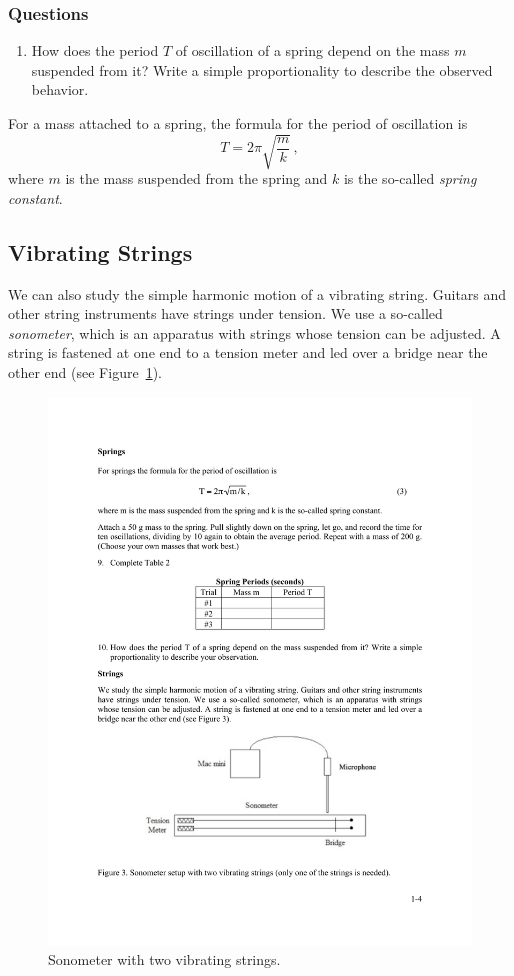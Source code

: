 \documentclass[11pt]{NSF}
\def\be{\begin{equation}}
\def\ee{\end{equation}}
\def\ben{\begin{enumerate}}
\def\een{\end{enumerate}}
\begin{document}
\subsubsection*{Questions}
%
\ben
\item 
How does the period $T$ of oscillation of a spring depend 
on the mass $m$ suspended from it? 
Write a simple proportionality to describe the observed behavior.
\een

For a mass attached to a spring, the formula for the period of 
oscillation is
\be
T=2\pi\sqrt{\frac{m}{k}}\,,
\ee
where $m$ is the mass suspended from the spring and $k$ is the so-called
{\em spring constant}.

\subsection{Vibrating Strings}

We can also study the simple harmonic motion of a vibrating string. 
Guitars and other string instruments have strings under tension. 
We use a so-called {\em sonometer},
which is an apparatus with strings whose tension can be adjusted. 
A string is fastened at one end to a tension meter and led over a 
bridge near the other end (see Figure~\ref{f:3}).
%
\begin{figure}[hbtp]
\begin{center}
\includegraphics[width=.75\textwidth]{fig1_3}
\caption{Sonometer with two vibrating strings.}
\label{f:3}
\end{center}
\end{figure}
%
\end{document}
